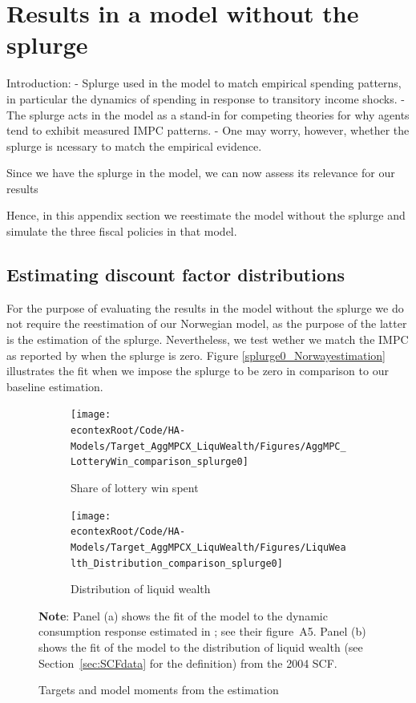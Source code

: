 \documentclass[\econtexRoot/HAFiscal]{subfiles}
\begin{document}
\hypertarget{Model_without_splurge}{}\par\section{Results in a model without the splurge}
\notinsubfile{\label{app:Model_without_splurge}}


Introduction:
- Splurge used in the model to match empirical spending patterns, in particular the dynamics of spending in response to transitory income shocks.
- The splurge acts in the model as a stand-in for competing theories for why agents tend to exhibit measured IMPC patterns.
- One may worry, however, whether the splurge is ncessary to match the empirical evidence. 

Since we have the splurge in the model, we can now assess its relevance for our results

Hence, in this appendix section we reestimate the model without the splurge and simulate the three fiscal policies in that model. 


\subsection{Estimating discount factor distributions}

For the purpose of evaluating the results in the model without the splurge we do not require the reestimation of our Norwegian model, as the purpose of the latter is the estimation of the splurge. Nevertheless, we test wether we match the IMPC as reported by \citet{fagereng_mpc_2021} when the splurge is zero. Figure \ref{splurge0_Norwayestimation} illustrates the fit when we impose the splurge to be zero in comparison to our baseline estimation. 

\begin{figure}[htb]
	\centering
	\begin{subfigure}[b]{.48\linewidth}
		\centering
		\texttt{[image: \\econtexRoot/Code/HA-Models/Target\_AggMPCX\_LiquWealth/Figures/AggMPC\_LotteryWin\_comparison\_splurge0]}
		\caption{Share of lottery win spent}
		\notinsubfile{\label{fig:aggmpclotterywin}}
	\end{subfigure}
	\begin{subfigure}[b]{.48\linewidth}
		\centering
		\texttt{[image: \\econtexRoot/Code/HA-Models/Target\_AggMPCX\_LiquWealth/Figures/LiquWealth\_Distribution\_comparison\_splurge0]}
		\caption{Distribution of liquid wealth}
		\notinsubfile{\label{fig:liquwealthdistribution}}
	\end{subfigure}%
	\caption{Targets and model moments from the estimation}
	\notinsubfile{\label{fig:splurge0_Norwayestimation}}
	\parbox{16cm}{\small \vspace{.15cm} \textbf{Note}: Panel (a) shows the fit of the model to the dynamic consumption response estimated in \citet{fagereng_mpc_2021}; see their figure~A5. Panel (b) shows the fit of the model to the distribution of liquid wealth (see Section~\ref{sec:SCFdata} for the definition) from the 2004 SCF.\normalsize}
\end{figure}
\end{document}
